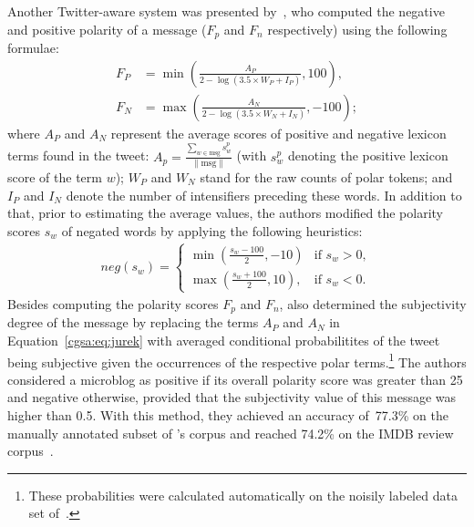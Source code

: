 Another Twitter-aware system was presented by~\citet{Jurek:15}, who
computed the negative and positive polarity of a message ($F_p$ and
$F_n$ respectively) using the following formulae: { \small%
  \begin{align}
    F_P &= \min\left(\frac{A_P}{2 - \log(3.5\times W_P + I_P)}, 100\right),\\
    F_N &= \max\left(\frac{A_N}{2 - \log(3.5\times W_N + I_N)}, -100\right);\label{cgsa:eq:jurek}
  \end{align}%
  \normalsize%
}%
where $A_P$ and $A_N$ represent the average scores of positive and
negative lexicon terms found in the tweet:
$A_p = \frac{\sum_{w\in\textrm{msg}}s^p_w}{\lVert\textrm{msg}\rVert}$
(with $s^p_w$ denoting the positive lexicon score of the term $w$);
$W_P$ and $W_N$ stand for the raw counts of polar tokens; and $I_P$
and $I_N$ denote the number of intensifiers preceding these words.  In
addition to that, prior to estimating the average values, the authors
modified the polarity scores $s_w$ of negated words by applying the
following heuristics: { \small%
  \begin{align}
neg(s_w) =
    \begin{cases}
        \min\left(\frac{s_w - 100}{2}, -10\right) & \text{if } s_w > 0,\\
        \max\left(\frac{s_w + 100}{2}, 10\right), & \text{if } s_w < 0.
    \end{cases}
\end{align}%
\normalsize%
}%
Besides computing the polarity scores $F_p$ and $F_n$,
\citeauthor{Jurek:15} also determined the subjectivity degree of the
message by replacing the terms $A_P$ and $A_N$ in
Equation~\ref{cgsa:eq:jurek} with averaged conditional probabilitites
of the tweet being subjective given the occurrences of the respective
polar terms.\footnote{These probabilities were calculated
  automatically on the noisily labeled data set of~\citet{Go:09}.}
The authors considered a microblog as positive if its overall polarity
score was greater than 25 and negative otherwise, provided that the
subjectivity value of this message was higher than 0.5.  With this
method, they achieved an accuracy of~77.3\% on the manually annotated
subset of \citeauthor{Go:09}'s corpus and reached 74.2\% on the IMDB
review corpus~\cite{Maas:11}.

